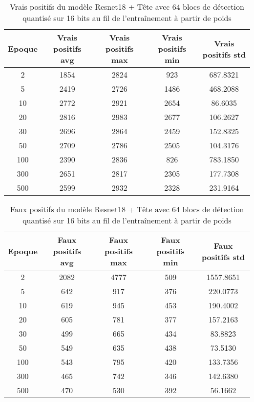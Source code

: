 \begin{table}[!ht]
    \caption{Vrais positifs du modèle Resnet18 + Tête avec 64 blocs de détection quantisé sur 16 bits au fil de l'entraînement à partir de poids}
    \label{tab:qresnet18+head_64n_true_positive_16b_from_weights}
    \centering
    \begin{tabular}{ |c||c|c|c|c|  }
        \hline
        \rowcolor{gray!50}
        Epoque & Vrais positifs avg & Vrais positifs max & Vrais positifs min & Vrais positifs std\\
        \hline
        2 & 1854 & 2824 & 923 & 687.8321\\
        5 & 2419 & 2726 & 1486 & 468.2088\\
        10 & 2772 & 2921 & 2654 & 86.6035\\
        20 & 2816 & 2983 & 2677 & 106.2627\\
        30 & 2696 & 2864 & 2459 & 152.8325\\
        50 & 2709 & 2786 & 2505 & 104.3176\\
        100 & 2390 & 2836 & 826 & 783.1850\\
        300 & 2651 & 2817 & 2305 & 177.7308\\
        500 & 2599 & 2932 & 2328 & 231.9164\\
        \hline
    \end{tabular}
\end{table}

\begin{table}[!ht]
    \caption{Faux positifs du modèle Resnet18 + Tête avec 64 blocs de détection quantisé sur 16 bits au fil de l'entraînement à partir de poids}
    \label{tab:qresnet18+head_64n_false_positive_16b_from_weights}
    \centering
    \begin{tabular}{ |c||c|c|c|c|  }
        \hline
        \rowcolor{gray!50}
        Epoque & Faux positifs avg & Faux positifs max & Faux positifs min & Faux positifs std\\
        \hline
        2 & 2082 & 4777 & 509 & 1557.8651\\
        5 & 642 & 917 & 376 & 220.0773\\
        10 & 619 & 945 & 453 & 190.4002\\
        20 & 605 & 781 & 377 & 157.2163\\
        30 & 499 & 665 & 434 & 83.8823\\
        50 & 549 & 635 & 438 & 73.5130\\
        100 & 543 & 795 & 420 & 133.7356\\
        300 & 465 & 742 & 346 & 142.6380\\
        500 & 470 & 530 & 392 & 56.1662\\
        \hline
    \end{tabular}
\end{table}

